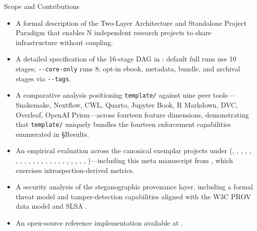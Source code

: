 \documentclass[
  ignorenonframetext,
]{beamer}
\providecommand{\tightlist}{%
  \setlength{\itemsep}{0pt}\setlength{\parskip}{0pt}}
\begin{document}
\begin{frame}{Scope and Contributions}
\begin{itemize}
\tightlist
\item
  A formal description of the Two-Layer Architecture and Standalone
  Project Paradigm that enables N independent research projects to share
  infrastructure without coupling.
\item
  A detailed specification of the 16-stage DAG in
  : default full runs
  use 10 stages; \texttt{-\/-core-only} runs 8; opt-in ebook, metadata,
  bundle, and archival stages via \texttt{-\/-tags}.
\item
  A comparative analysis positioning \texttt{template/} against nine
  peer tools---Snakemake, Nextflow, CWL, Quarto, Jupyter Book, R
  Markdown, DVC, Overleaf, OpenAI Prism---across fourteen feature
  dimensions, demonstrating that \texttt{template/} uniquely bundles the
  fourteen enforcement capabilities enumerated in §Results.
\item
  An empirical evaluation across the canonical exemplar projects under
  (,
  ,
  ,
  ,
  ,
  ,
  ,
  ,
  ,
  ,
  ,
  ,
  ,
  ,
  ,
  ,
  ,
  ,
  ,
  ,
  ,
  ,
  )---including this meta
  manuscript from , which
  exercises introspection-derived metrics.
\item
  A security analysis of the steganographic provenance layer, including
  a formal threat model and tamper-detection capabilities aligned with
  the W3C PROV data model  and SLSA
  .
\item
  An open-source reference implementation available at
  .
\end{itemize}
\end{frame}
\end{document}
